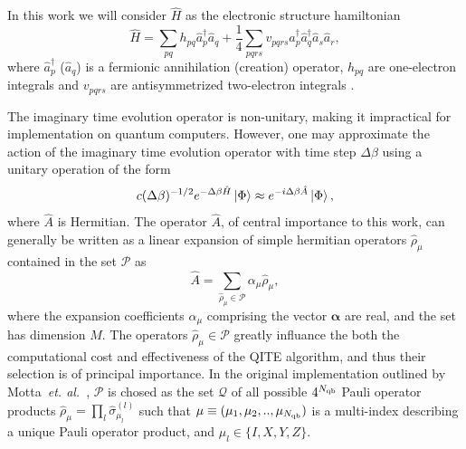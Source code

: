 \documentclass[aip,jcp,amsmath,amssymb, reprint]{revtex4-1}
\newcommand{\cop}[1]{\hat{a}^{\dagger}_{#1}}
\newcommand{\aop}[1]{\hat{a}_{#1}}
\providecommand{\norm}[1]{\lVert#1\rVert}
\begin{document}
In this work we will consider $\hat{H}$ as the electronic structure hamiltonian
\begin{equation}
\hat{H} = \sum_{pq} h_{pq} \cop{p} \aop{q}
+ \frac{1}{4} \sum_{pqrs}
v_{pqrs} \cop{p} \cop{q} \aop{s} \aop{r},
\end{equation}
where $\cop{p}$ ($\aop{q}$) is a fermionic annihilation (creation) operator, $h_{pq}$ are one-electron integrals and $v_{pqrs}$
are antisymmetrized two-electron integrals \cite{crawford2000introduction}.

The imaginary time evolution operator is non-unitary, making it impractical for implementation on quantum computers.
However, one may approximate the action of the imaginary time evolution operator with time step $\Delta \beta$ using a unitary operation of the form  
\begin{equation}
 c(\Delta \beta)^{-1/2} e^{-\Delta \beta \hat{H} } \ket{\Phi} \approx e^{-i \Delta \beta \hat{A} } \ket{\Phi},
\end{equation}
where $\hat{A}$ is Hermitian. 
The operator $\hat{A}$, of central importance to this work, can generally be written as a linear expansion of simple hermitian operators $\hat{\rho}_\mu$ contained in the set $\mathcal{P}$ as
\begin{equation}
\hat{A} = \sum_{\hat{\rho}_\mu \in \mathcal{P}} \alpha_\mu \hat{\rho}_\mu,
\end{equation} 
where the expansion coefficients $\alpha_\mu$ comprising the vector $\boldsymbol{\alpha}$ are real, and the set has dimension $M$.
The operators $\hat{\rho}_\mu \in \mathcal{P}$ greatly influance the both the computational cost and effectiveness of the QITE algorithm, and thus their selection is of principal importance.  
In the original implementation outlined by Motta~\textit{et. al.}~\cite{motta2019determining}, $\mathcal{P}$ is chosed as the set $\mathcal{Q}$ of all possible $4^{N_{\rm{qb}}}$ Pauli operator products $\hat{ \rho}_\mu  = \prod_l \hat{\sigma}_{\mu_l}^{(l)}$ such that $\mu \equiv (\mu_1, \mu_2, .., \mu_{N_{\rm{qb}}}) $ is a multi-index describing a unique Pauli operator product, and $\mu_l \in \{ I, X, Y, Z \}$.
\end{document}
